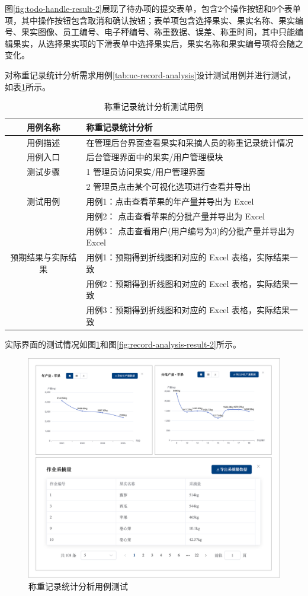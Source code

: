图\ref{fig:todo-handle-result-2}展现了待办项的提交表单，包含2个操作按钮和9个表单项，其中操作按钮包含取消和确认按钮；表单项包含选择果实、果实名称、果实编号、果实图像、员工编号、电子秤编号、称重数据、误差、称重时间，其中只能编辑果实，从选择果实项的下滑表单中选择果实后，果实名称和果实编号项将会随之变化。

对称重记录统计分析需求用例\ref{tab:uc-record-analysis}设计测试用例并进行测试，如表\ref{tab:uc-record-analysis-test}所示。

\begin{longtable}[ht]{|c|p{8cm}|}
\caption{称重记录统计分析测试用例}
\label{tab:uc-record-analysis-test}
\\
\hline
用例名称 & 称重记录统计分析 \\
\hline
用例描述 & 在管理后台界面查看果实和采摘人员的称重记录统计情况 \\
\hline
用例入口 & 后台管理界面中的果实/用户管理模块 \\
\hline
测试步骤 & 1 管理员访问果实/用户管理界面 \\
& 2 管理员点击某个可视化选项进行查看并导出 \\
\hline
\newpage
\hline
测试用例 & 用例1：点击查看苹果的年产量并导出为 Excel \\
& 用例2： 点击查看苹果的分批产量并导出为 Excel \\
& 用例3： 点击查看用户(用户编号为3)的分批产量并导出为 Excel  \\
\hline
预期结果与实际结果 & 用例1：预期得到折线图和对应的 Excel 表格，实际结果一致 \\
& 用例2：预期得到折线图和对应的 Excel 表格，实际结果一致 \\
& 用例3：预期得到折线图和对应的 Excel 表格，实际结果一致 \\
\hline
\end{longtable}

实际界面的测试情况如图\ref{fig:record-analysis-result-1}和图\ref{fig:record-analysis-result-2}所示。

\begin{figure}[H]
    \centering
    \includegraphics[width=0.9\linewidth]{../result/record-analysis-result-1.png}
    \caption{称重记录统计分析用例测试}
    \label{fig:record-analysis-result-1}
\end{figure}

